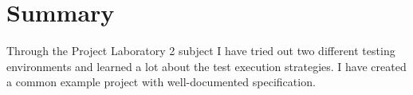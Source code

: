 \chapter{Summary}\label{chapt:Summary}
Through the Project Laboratory 2 subject I have tried out two different testing environments and learned a lot about the test execution strategies. I have created a common example project with well-documented specification.